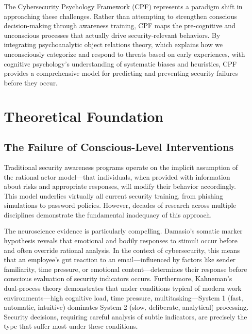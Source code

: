 \documentclass[manuscript,screen,review]{acmart}
\begin{document}
The Cybersecurity Psychology Framework (CPF) represents a paradigm shift in approaching these challenges. Rather than attempting to strengthen conscious decision-making through awareness training, CPF maps the pre-cognitive and unconscious processes that actually drive security-relevant behaviors. By integrating psychoanalytic object relations theory, which explains how we unconsciously categorize and respond to threats based on early experiences, with cognitive psychology's understanding of systematic biases and heuristics, CPF provides a comprehensive model for predicting and preventing security failures before they occur.

\section{Theoretical Foundation}

\subsection{The Failure of Conscious-Level Interventions}

Traditional security awareness programs operate on the implicit assumption of the rational actor model—that individuals, when provided with information about risks and appropriate responses, will modify their behavior accordingly\cite{ajzen1991}. This model underlies virtually all current security training, from phishing simulations to password policies. However, decades of research across multiple disciplines demonstrate the fundamental inadequacy of this approach.

The neuroscience evidence is particularly compelling. Damasio's somatic marker hypothesis\cite{damasio1994} reveals that emotional and bodily responses to stimuli occur before and often override rational analysis. In the context of cybersecurity, this means that an employee's gut reaction to an email—influenced by factors like sender familiarity, time pressure, or emotional content—determines their response before conscious evaluation of security indicators occurs. Furthermore, Kahneman's dual-process theory\cite{kahneman2011} demonstrates that under conditions typical of modern work environments—high cognitive load, time pressure, multitasking—System 1 (fast, automatic, intuitive) dominates System 2 (slow, deliberate, analytical) processing. Security decisions, requiring careful analysis of subtle indicators, are precisely the type that suffer most under these conditions.
\end{document}
